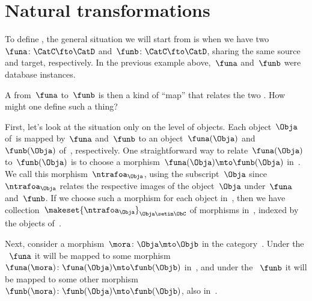 \section{Natural transformations}

To define , the general situation we will start from is when we have two ~$\funa \colon \CatC \fto \CatD$  and~$\funb \colon \CatC \fto \CatD$, sharing the same source and target, respectively.
In the previous example above,~$\funa$ and~$\funb$ were database instances.

A  from~$\funa$ to~$\funb$ is then a kind of ``map'' that relates the two .
How might one define such a thing?

First, let's look at the situation only on the level of objects.
Each object~$\Obja$ of~\CatC is mapped by~$\funa$ and~$\funb$ to an object~$\funa(\Obja)$ and~$\funb(\Obja)$ of~\CatD, respectively.
One straightforward way to relate~$\funa(\Obja)$ to~$\funb(\Obja)$ is to choose a morphism~$\funa(\Obja) \mto \funb(\Obja)$ in~\CatD.
We call this morphism~$\ntrafoa_{\Obja}$, using the subscript~$\Obja$ since~$\ntrafoa_{\Obja}$ relates the respective images of the object~$\Obja$ under~$\funa$ and~$\funb$.
If we choose such a morphism for each object in~\CatC, then we have collection~$\makeset{ \ntrafoa_\Obja }_{\Obja \setin \ObC}$ of morphisms in~\CatD, indexed by the objects of~\CatC.

\begin{marginfigure}
    \hfill
\end{marginfigure}

Next, consider a morphism~$\mora \colon \Obja \mto \Objb$ in the category~\CatC.
Under the ~$\funa$ it will be mapped to some morphism~$\funa(\mora)\colon \funa(\Obja) \mto \funb(\Objb)$ in~\CatD, and under the ~$\funb$ it will be mapped to some other morphism~$\funb(\mora)\colon \funb(\Obja) \mto \funb(\Objb)$, also in~\CatD.

\vspace{5mm}
\begin{marginfigure}
    \hfill
\end{marginfigure}

